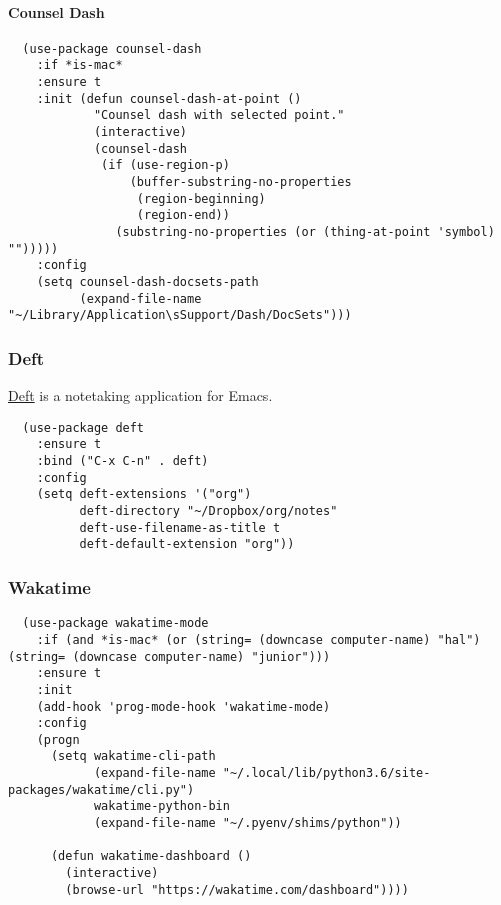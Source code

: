 \documentclass[11pt]{article}
\begin{document}
\paragraph*{Counsel Dash}
\label{sec:org90f0b0b}

\begin{verbatim}
  (use-package counsel-dash
    :if *is-mac*
    :ensure t
    :init (defun counsel-dash-at-point ()
            "Counsel dash with selected point."
            (interactive)
            (counsel-dash
             (if (use-region-p)
                 (buffer-substring-no-properties
                  (region-beginning)
                  (region-end))
               (substring-no-properties (or (thing-at-point 'symbol) "")))))
    :config
    (setq counsel-dash-docsets-path
          (expand-file-name "~/Library/Application\sSupport/Dash/DocSets")))
\end{verbatim}

\subsubsection*{Deft}
\label{sec:org5c8a397}

\href{https://jblevins.org/projects/deft/}{Deft} is a notetaking application for Emacs.

\begin{verbatim}
  (use-package deft
    :ensure t
    :bind ("C-x C-n" . deft)
    :config
    (setq deft-extensions '("org")
          deft-directory "~/Dropbox/org/notes"
          deft-use-filename-as-title t
          deft-default-extension "org"))
\end{verbatim}

\subsubsection*{Wakatime}
\label{sec:orgdf602a2}

\begin{verbatim}
  (use-package wakatime-mode
    :if (and *is-mac* (or (string= (downcase computer-name) "hal") (string= (downcase computer-name) "junior")))
    :ensure t
    :init
    (add-hook 'prog-mode-hook 'wakatime-mode)
    :config
    (progn
      (setq wakatime-cli-path
            (expand-file-name "~/.local/lib/python3.6/site-packages/wakatime/cli.py")
            wakatime-python-bin
            (expand-file-name "~/.pyenv/shims/python"))

      (defun wakatime-dashboard ()
        (interactive)
        (browse-url "https://wakatime.com/dashboard"))))
\end{verbatim}
\end{document}
